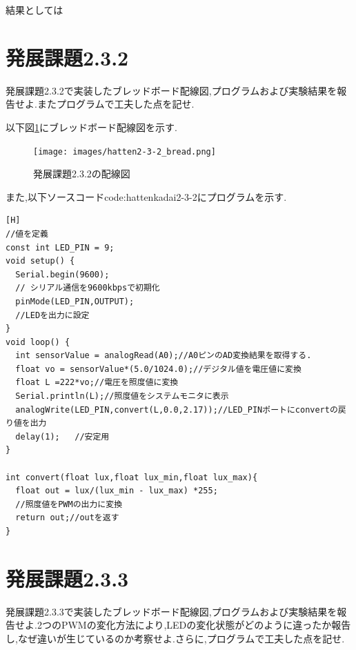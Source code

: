\documentclass{jarticle}
\begin{document}
結果としては
\section{発展課題2.3.2}

発展課題2.3.2で実装したブレッドボード配線図,プログラムおよび実験結果を報告せよ.またプログラムで工夫した点を記せ.


以下図\ref{fig:hattenkadai2-3-2bread}にブレッドボード配線図を示す.

\begin{figure}[H]
\begin{center}
\texttt{[image: images/hatten2-3-2\_bread.png]}
\caption{発展課題2.3.2の配線図}
\label{fig:hattenkadai2-3-2bread}
\end{center}
\end{figure}

また,以下ソースコード{code:hattenkadai2-3-2}にプログラムを示す.

\begin{lstlisting}[caption=発展課題2.3.2,label=code:hattenkadai2-3-2][H]
//値を定義
const int LED_PIN = 9;
void setup() {
  Serial.begin(9600);
  // シリアル通信を9600kbpsで初期化
  pinMode(LED_PIN,OUTPUT);
  //LEDを出力に設定
}
void loop() {
  int sensorValue = analogRead(A0);//A0ピンのAD変換結果を取得する.
  float vo = sensorValue*(5.0/1024.0);//デジタル値を電圧値に変換
  float L =222*vo;//電圧を照度値に変換
  Serial.println(L);//照度値をシステムモニタに表示
  analogWrite(LED_PIN,convert(L,0.0,2.17));//LED_PINポートにconvertの戻り値を出力
  delay(1);   //安定用
}

int convert(float lux,float lux_min,float lux_max){
  float out = lux/(lux_min - lux_max) *255;
  //照度値をPWMの出力に変換
  return out;//outを返す
}
\end{lstlisting}


\section{発展課題2.3.3}

発展課題2.3.3で実装したブレッドボード配線図,プログラムおよび実験結果を報告せよ.2つのPWMの変化方法により,LEDの変化状態がどのように違ったか報告し,なぜ違いが生じているのか考察せよ.さらに,プログラムで工夫した点を記せ.
\end{document}
